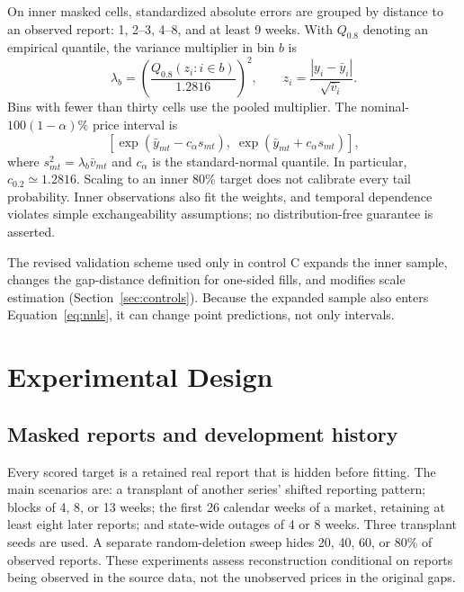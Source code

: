 \documentclass[sigconf,nonacm,balance=false]{acmart}
\begin{document}
On inner masked cells, standardized absolute errors are grouped by distance to an observed report: 1, 2--3, 4--8, and at least 9 weeks. With $Q_{0.8}$ denoting an empirical quantile, the variance multiplier in bin $b$ is
\begin{equation}\label{eq:scale}
\lambda_b=\left(\frac{Q_{0.8}(z_i:i\in b)}{1.2816}\right)^2,
\qquad z_i=\frac{|y_i-\bar y_i|}{\sqrt{\bar v_i}}.
\end{equation}
Bins with fewer than thirty cells use the pooled multiplier. The nominal-$100(1-\alpha)\%$ price interval is
\begin{equation}\label{eq:interval}
\left[\exp(\bar y_{mt}-c_\alpha s_{mt}),\;
      \exp(\bar y_{mt}+c_\alpha s_{mt})\right],
\end{equation}
where $s_{mt}^2=\lambda_b\bar v_{mt}$ and $c_\alpha$ is the standard-normal quantile. In particular, $c_{0.2}\simeq1.2816$. Scaling to an inner 80\% target does not calibrate every tail probability. Inner observations also fit the weights, and temporal dependence violates simple exchangeability assumptions; no distribution-free guarantee is asserted.

The revised validation scheme used only in control C expands the inner sample, changes the gap-distance definition for one-sided fills, and modifies scale estimation (Section~\ref{sec:controls}). Because the expanded sample also enters Equation~\eqref{eq:nnls}, it can change point predictions, not only intervals.

\section{Experimental Design}\label{sec:design}

\subsection{Masked reports and development history}

Every scored target is a retained real report that is hidden before fitting. The main scenarios are: a transplant of another series' shifted reporting pattern; blocks of 4, 8, or 13 weeks; the first 26 calendar weeks of a market, retaining at least eight later reports; and state-wide outages of 4 or 8 weeks. Three transplant seeds are used. A separate random-deletion sweep hides 20, 40, 60, or 80\% of observed reports. These experiments assess reconstruction conditional on reports being observed in the source data, not the unobserved prices in the original gaps.
\end{document}
